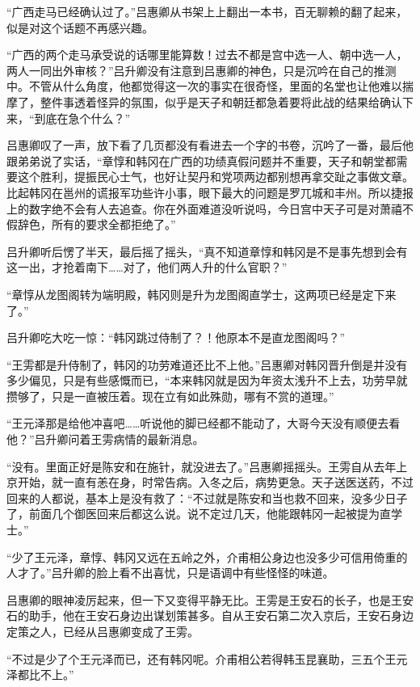 “广西走马已经确认过了。”吕惠卿从书架上上翻出一本书，百无聊赖的翻了起来，似是对这个话题不再感兴趣。

“广西的两个走马承受说的话哪里能算数！过去不都是宫中选一人、朝中选一人，两人一同出外审核？”吕升卿没有注意到吕惠卿的神色，只是沉吟在自己的推测中。不管从什么角度，他都觉得这一次的事实在很奇怪，里面的名堂也让他难以揣摩了，整件事透着怪异的氛围，似乎是天子和朝廷都急着要将此战的结果给确认下来，“到底在急个什么？”

吕惠卿叹了一声，放下看了几页都没有看进去一个字的书卷，沉吟了一番，最后他跟弟弟说了实话，“章惇和韩冈在广西的功绩真假问题并不重要，天子和朝堂都需要这个胜利，提振民心士气，也好让契丹和党项两边都别想再拿交趾之事做文章。比起韩冈在邕州的谎报军功些许小事，眼下最大的问题是罗兀城和丰州。所以捷报上的数字绝不会有人去追查。你在外面难道没听说吗，今日宫中天子可是对萧禧不假辞色，所有的要求全都拒绝了。”

吕升卿听后愣了半天，最后摇了摇头，“真不知道章惇和韩冈是不是事先想到会有这一出，才抢着南下……对了，他们两人升的什么官职？”

“章惇从龙图阁转为端明殿，韩冈则是升为龙图阁直学士，这两项已经是定下来了。”

吕升卿吃大吃一惊：“韩冈跳过侍制了？！他原本不是直龙图阁吗？”

“王雱都是升侍制了，韩冈的功劳难道还比不上他。”吕惠卿对韩冈晋升倒是并没有多少偏见，只是有些感慨而已，“本来韩冈就是因为年资太浅升不上去，功劳早就攒够了，只是一直被压着。现在立有如此殊勋，哪有不赏的道理。”

“王元泽那是给他冲喜吧……听说他的脚已经都不能动了，大哥今天没有顺便去看他？”吕升卿问着王雱病情的最新消息。

“没有。里面正好是陈安和在施针，就没进去了。”吕惠卿摇摇头。王雱自从去年上京开始，就一直有恙在身，时常告病。入冬之后，病势更急。天子送医送药，不过回来的人都说，基本上是没有救了：“不过就是陈安和当也救不回来，没多少日子了，前面几个御医回来后都这么说。说不定过几天，他能跟韩冈一起被提为直学士。”

“少了王元泽，章惇、韩冈又远在五岭之外，介甫相公身边也没多少可信用倚重的人才了。”吕升卿的脸上看不出喜忧，只是语调中有些怪怪的味道。

吕惠卿的眼神凌厉起来，但一下又变得平静无比。王雱是王安石的长子，也是王安石的助手，他在王安石身边出谋划策甚多。自从王安石第二次入京后，王安石身边定策之人，已经从吕惠卿变成了王雱。

“不过是少了个王元泽而已，还有韩冈呢。介甫相公若得韩玉昆襄助，三五个王元泽都比不上。”

